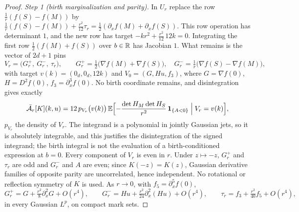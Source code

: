 \begin{proof}
\emph{Step 1 (birth marginalization and parity).} In $U_r$ replace the row $\frac1r(f(S)-f(M))$ by $\frac1r(f(S)-f(M))+\frac{r^2}{12}\tau_r=\frac12(\partial_xf(M)+\partial_xf(S))$. This row operation has determinant $1$, and the new row has target $-kr^2+\frac{r^2}{12}\,12k=0$. Integrating the first row $\frac12(f(M)+f(S))$ over $b\in\mathbb R$ has Jacobian $1$. What remains is the vector of $2d+1$ pins
\begin{equation}\label{eq:ctwo-V}
V_r=\bigl(G^+_r,\ G^-_r,\ \tau_r\bigr),\qquad G^+_r=\tfrac12\bigl(\nabla f(M)+\nabla f(S)\bigr),\quad G^-_r=\tfrac1r\bigl(\nabla f(S)-\nabla f(M)\bigr),
\end{equation}
with target $v(k)=(0_d,0_d,12k)$ and $V_0=(G,Hu,f_3)$, where $G=\nabla f(0)$, $H=D^2f(0)$, $f_3=\partial_x^3f(0)$. No birth coordinate remains, and disintegration gives exactly
\begin{equation}\label{eq:ctwo-birth}
\bar{\mathcal A}_r[K](k,u)=12\,p_{V_r}\bigl(v(k)\bigr)\,\mathbb E\Bigl[-\frac{\det H_M\det H_S}{r^2}\,\mathbf 1_{\{A<0\}}\Bigm|V_r=v(k)\Bigr],
\end{equation}
$p_{V_r}$ the density of $V_r$. The integrand is a polynomial in jointly Gaussian jets, so it is absolutely integrable, and this justifies the disintegration of the signed integrand; the birth integral is not the evaluation of a birth-conditioned expression at $b=0$. Every component of $V_r$ is even in $r$. Under $z\mapsto-z$, $G^+_r$ and $\tau_r$ are odd and $G^-_r$ and $A$ are even; since $K(-z)=K(z)$, Gaussian derivative families of opposite parity are uncorrelated, hence independent. No rotational or reflection symmetry of $K$ is used. As $r\to0$, with $f_5=\partial_x^5f(0)$,
\begin{equation}\label{eq:ctwo-Vexp}
G^+_r=G+\tfrac{r^2}8\partial_x^2G+O(r^4),\qquad G^-_r=Hu+\tfrac{r^2}{24}\partial_x^2(Hu)+O(r^4),\qquad \tau_r=f_3+\tfrac{r^2}{40}f_5+O(r^4),
\end{equation}
in every Gaussian $L^p$, on compact mark sets.


\end{proof}
